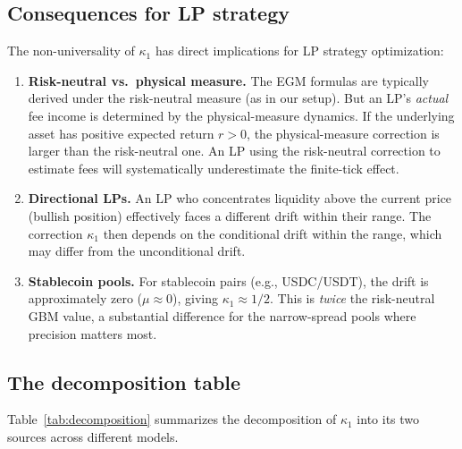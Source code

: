 \documentclass[11pt]{article}
\theoremstyle{definition}
\theoremstyle{remark}
\begin{document}
\subsection{Consequences for LP strategy}

The non-universality of $\kappa_1$ has direct implications for LP
strategy optimization:

\begin{enumerate}[label=(\arabic*)]
\item \textbf{Risk-neutral vs.\ physical measure.} The EGM formulas
are typically derived under the risk-neutral measure (as in our
setup). But an LP's \emph{actual} fee income is determined by the
physical-measure dynamics. If the underlying asset has positive
expected return $r > 0$, the physical-measure correction is larger
than the risk-neutral one. An LP using the risk-neutral correction
to estimate fees will systematically underestimate the finite-tick
effect.

\item \textbf{Directional LPs.} An LP who concentrates liquidity
above the current price (bullish position) effectively faces a
different drift within their range. The correction $\kappa_1$ then
depends on the conditional drift within the range, which may differ
from the unconditional drift.

\item \textbf{Stablecoin pools.} For stablecoin pairs (e.g.,
USDC/USDT), the drift is approximately zero ($\mu \approx 0$), giving
$\kappa_1 \approx 1/2$. This is \emph{twice} the risk-neutral GBM
value, a substantial difference for the narrow-spread pools where
precision matters most.
\end{enumerate}

\subsection{The decomposition table}

Table~\ref{tab:decomposition} summarizes the decomposition of
$\kappa_1$ into its two sources across different models.
\end{document}
